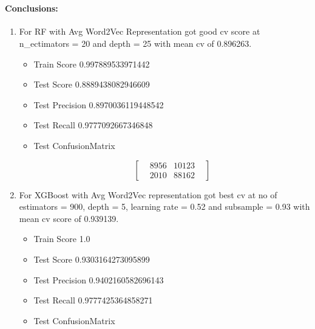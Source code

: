 \documentclass[11pt]{article}
\providecommand{\tightlist}{%
      \setlength{\itemsep}{0pt}\setlength{\parskip}{0pt}}
\begin{document}
    \begin{center}
    \end{center}
    { \hspace*{\fill} \\}
    
    \paragraph{\texorpdfstring{Conclusions:}{Conclusions: }}\label{conclusions}

\begin{enumerate}
\def\labelenumi{\arabic{enumi}.}
\tightlist
\item
  For RF with Avg Word2Vec Representation got good cv score at
  n\_ectimators = 20 and depth = 25 with mean cv of 0.896263.

  \begin{itemize}
  \tightlist
  \item
    Train Score 0.997889533971442
  \item
    Test Score 0.8889438082946609
  \item
    Test Precision 0.8970036119448542
  \item
    Test Recall 0.9777092667346848
  \item
    Test ConfusionMatrix

    \begin{equation}
    \begin{bmatrix}
    & 8956 & 10123 &  \\
    & 2010 & 88162 & 
    \end{bmatrix}
    \end{equation}
  \end{itemize}
\item
  For XGBoost with Avg Word2Vec representation got best cv at no of
  estimators = 900, depth = 5, learning rate = 0.52 and subsample = 0.93
  with mean cv score of 0.939139.

  \begin{itemize}
  \tightlist
  \item
    Train Score 1.0
  \item
    Test Score 0.9303164273095899
  \item
    Test Precision 0.9402160582696143
  \item
    Test Recall 0.9777425364858271
  \item
    Test ConfusionMatrix


\end{itemize}
\end{enumerate}
\end{document}
